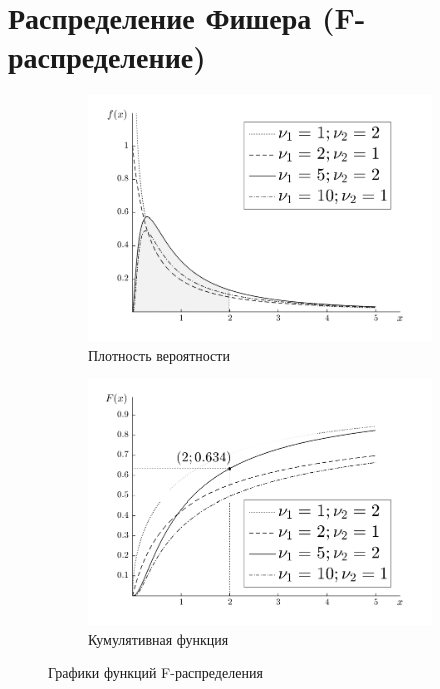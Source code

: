 \documentclass[12pt,a4paper]{article}
\begin{document}
\section{Распределение Фишера (F-распределение)}
\begin{figure}[H]
\centering
	\begin{subfigure}[t]{7cm}
		\centering
		\includegraphics[scale=0.5]{img/fdistribution_pdf.png}
		\caption{Плотность вероятности}
\label{fig:a_normal_pdf}	
	\end{subfigure}
	\begin{subfigure}[t]{5cm}
		\centering
		\includegraphics[scale=0.5]{img/fdistribution_cdf.png}
		\caption{Кумулятивная функция}
\label{fig:b_normal_cdf}
	\end{subfigure}
	\caption{Графики функций F-распределения}\label{fig:df_and_cdf}
\end{figure}
\end{document}
